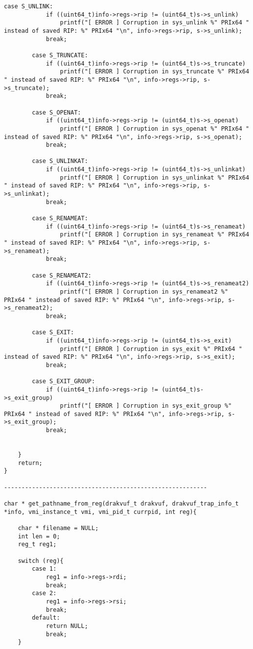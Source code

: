 {\begin{lstlisting}[style=CStyle]
		case S_UNLINK:
			if ((uint64_t)info->regs->rip != (uint64_t)s->s_unlink) 	
				printf("[ ERROR ] Corruption in sys_unlink %" PRIx64 " instead of saved RIP: %" PRIx64 "\n", info->regs->rip, s->s_unlink);
			break;
		
		case S_TRUNCATE:
			if ((uint64_t)info->regs->rip != (uint64_t)s->s_truncate) 	
				printf("[ ERROR ] Corruption in sys_truncate %" PRIx64 " instead of saved RIP: %" PRIx64 "\n", info->regs->rip, s->s_truncate);
			break;
		
		case S_OPENAT:
			if ((uint64_t)info->regs->rip != (uint64_t)s->s_openat) 	
				printf("[ ERROR ] Corruption in sys_openat %" PRIx64 " instead of saved RIP: %" PRIx64 "\n", info->regs->rip, s->s_openat);
			break;
		
		case S_UNLINKAT:
			if ((uint64_t)info->regs->rip != (uint64_t)s->s_unlinkat) 	
				printf("[ ERROR ] Corruption in sys_unlinkat %" PRIx64 " instead of saved RIP: %" PRIx64 "\n", info->regs->rip, s->s_unlinkat);
			break;
		
		case S_RENAMEAT:
			if ((uint64_t)info->regs->rip != (uint64_t)s->s_renameat) 	
				printf("[ ERROR ] Corruption in sys_renameat %" PRIx64 " instead of saved RIP: %" PRIx64 "\n", info->regs->rip, s->s_renameat);
			break;
		
		case S_RENAMEAT2:
			if ((uint64_t)info->regs->rip != (uint64_t)s->s_renameat2) 	
				printf("[ ERROR ] Corruption in sys_renameat2 %" PRIx64 " instead of saved RIP: %" PRIx64 "\n", info->regs->rip, s->s_renameat2);
			break;
		
		case S_EXIT:
			if ((uint64_t)info->regs->rip != (uint64_t)s->s_exit) 	
				printf("[ ERROR ] Corruption in sys_exit %" PRIx64 " instead of saved RIP: %" PRIx64 "\n", info->regs->rip, s->s_exit);
			break;
		
		case S_EXIT_GROUP:
			if ((uint64_t)info->regs->rip != (uint64_t)s->s_exit_group) 	
				printf("[ ERROR ] Corruption in sys_exit_group %" PRIx64 " instead of saved RIP: %" PRIx64 "\n", info->regs->rip, s->s_exit_group);
			break;
		
	
	}	
	return;
}

----------------------------------------------------------

char * get_pathname_from_reg(drakvuf_t drakvuf, drakvuf_trap_info_t *info, vmi_instance_t vmi, vmi_pid_t currpid, int reg){

	char * filename = NULL;
	int len = 0;
	reg_t reg1;
	
	switch (reg){
		case 1:
			reg1 = info->regs->rdi;
			break;
		case 2:
			reg1 = info->regs->rsi;
			break;
		default:
			return NULL;
			break;
	}
	

\end{lstlisting}}
